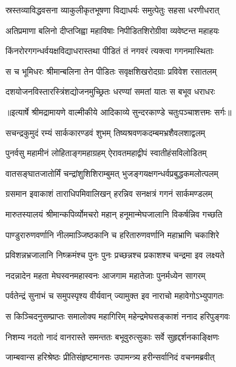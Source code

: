 \twolineshloka
{स्रस्तव्याविद्धवसना व्याकुलीकृतभूषणा}
{विद्याधर्यः समुत्पेतुः सहसा धरणीधरात्} %

\twolineshloka
{अतिप्रमाणा बलिनो दीप्तजिह्वा महाविषाः}
{निपीडितशिरोग्रीवा व्यवेष्टन्त महाहयः} %

\twolineshloka
{किंनरोरगगन्धर्वयक्षविद्याधरास्तथा}
{पीडितं तं नगवरं त्यक्त्वा गगनमास्थिताः} %

\twolineshloka
{स च भूमिधरः श्रीमान्बलिना तेन पीडितः}
{सवृक्षशिखरोदग्राः प्रविवेश रसातलम्} %

\twolineshloka
{दशयोजनविस्तारस्त्रिंशद्योजनमुच्छ्रितः}
{धरण्यां समतां यातः स बभूव धराधरः} %


{॥इत्यार्षे श्रीमद्रामायणे वाल्मीकीये आदिकाव्ये सुन्दरकाण्डे चतुःपञ्चाशत्तमः सर्गः॥}


\twolineshloka
{सचन्द्रकुमुदं रम्यं सार्ककारण्डवं शुभम्}
{तिष्यश्रवणकदम्बमभ्रशैवलशाद्वलम्} %

\twolineshloka
{पुनर्वसु महामीनं लोहिताङ्गमहाग्रहम्}
{ऐरावतमहाद्वीपं स्वातीहंसविलोडितम्} %

\twolineshloka
{वातसङ्घातजातोर्मिं चन्द्रांशुशिशिराम्बुमत्}
{भुजङ्गयक्षगन्धर्वप्रबुद्धकमलोत्पलम्} %

\twolineshloka
{ग्रसमान इवाकाशं ताराधिपमिवालिखन्}
{हरन्निव सनक्षत्रं गगनं सार्कमण्डलम्} %

\twolineshloka
{मारुतस्यालयं श्रीमान्कपिर्व्योमचरो महान्}
{हनूमान्मेघजालानि विकर्षन्निव गच्छति} %

\twolineshloka
{पाण्डुरारुणवर्णानि नीलमाञ्जिष्ठकानि च}
{हरितारुणवर्णानि महाभ्राणि चकाशिरे} %

\twolineshloka
{प्रविशन्नभ्रजालानि निष्क्रमंश्च पुनः पुनः}
{प्रच्छन्नश्च प्रकाशश्च चन्द्रमा इव लक्ष्यते} %

\twolineshloka
{नदन्नादेन महता मेघस्वनमहास्वनः}
{आजगाम महातेजाः पुनर्मध्येन सागरम्} %

\twolineshloka
{पर्वतेन्द्रं सुनाभं च समुपस्पृश्य वीर्यवान्}
{ज्यामुक्त इव नाराचो महावेगोऽभ्युपागतः} %

\twolineshloka
{स किञ्चिदनुसम्प्राप्तः समालोक्य महागिरिम्}
{महेन्द्रमेघसङ्काशं ननाद हरिपुङ्गवः} %

\twolineshloka
{निशम्य नदतो नादं वानरास्ते समन्ततः}
{बभूवुरुत्सुकाः सर्वे सुहृद्दर्शनकाङ्क्षिणः} %

\twolineshloka
{जाम्बवान्स हरिश्रेष्ठः प्रीतिसंहृष्टमानसः}
{उपामन्त्र्य हरीन्सर्वानिदं वचनमब्रवीत्} %

